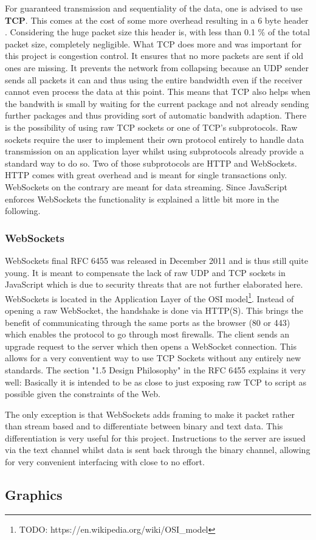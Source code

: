 For guaranteed transmission and sequentiality of the data, one is advised to use \textbf{TCP}. This comes at the cost of some more overhead resulting in a 6 byte header \cite{TODO: refrence}. Considering the huge packet size this header is, with less than 0.1 \% of the total packet size, completely negligible. What TCP does more and was important for this project is congestion control. It ensures that no more packets are sent if old ones are missing. It prevents the network from collapsing because an UDP sender sends all packets it can and thus using the entire bandwidth even if the receiver cannot even process the data at this point.
This means that TCP also helps when the bandwith is small by waiting for the current package and not already sending further packages and thus providing sort of automatic bandwith adaption.
There is the possibility of using raw TCP sockets or one of TCP's subprotocols. Raw sockets require the user to implement their own protocol entirely to handle data transmission on an application layer whilst using subprotocols already provide a standard way to do so.
Two of those subprotocols are HTTP and WebSockets. HTTP comes with great overhead and is meant for single transactions only.
WebSockets on the contrary are meant for data streaming.
Since JavaScript enforces WebSockets the functionality is explained a little bit more in the following.

\subsubsection{WebSockets}

WebSockets final RFC 6455\cite{TODO: https://tools.ietf.org/html/rfc6455,} was released in December 2011 and is thus still quite young. It is meant to compensate the lack of raw UDP and TCP sockets in JavaScript which is due to security threats that are not further elaborated here.
WebSockets is located in the Application Layer of the OSI model\footnote{TODO: https://en.wikipedia.org/wiki/OSI\_model}.
Instead of opening a raw WebSocket, the handshake is done via HTTP(S). This brings the benefit of communicating through the same ports as the browser (80 or 443) which enables the protocol to go through most firewalls.
The client sends an upgrade request to the server which then opens a WebSocket connection.
This allows for a very conventient way to use TCP Sockets without any entirely new standards.
The section "1.5 Design Philosophy" in the RFC 6455\cite{TODO: https://tools.ietf.org/html/rfc6455,} explains it very well:
Basically it is intended to be as close to just exposing raw TCP to script as possible given the constraints of the Web.

The only exception is that WebSockets adds framing to make it packet rather than stream based and to differentiate between binary and text data.
This differentiation is very useful for this project. Instructions to the server are issued via the text channel whilst data is sent back through the binary channel, allowing for very convenient interfacing with close to no effort.

\subsection{Graphics}